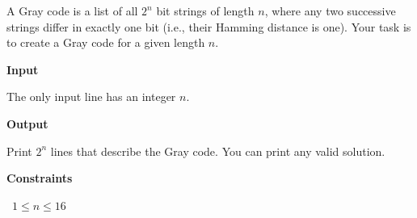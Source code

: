 A Gray code is a list of all $2^n$ bit strings of length $n$, where any two successive strings differ in exactly one bit (i.e., their Hamming distance is one).
Your task is to create a Gray code for a given length $n$.

\vspace{0.3cm}\noindent\textbf{Input}

The only input line has an integer $n$.

\vspace{0.3cm}\noindent\textbf{Output}

Print $2^n$ lines that describe the Gray code. You can print any valid solution.

\vspace{0.3cm}\noindent\textbf{Constraints}

\textbullet\ $1 \le n \le 16$